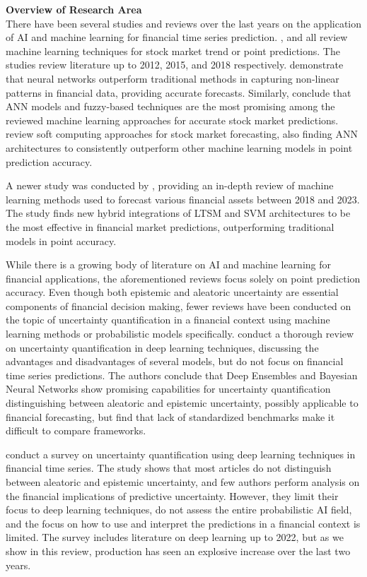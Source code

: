 \textbf{Overview of Research Area}\\
There have been several studies and reviews over the last years on the application of AI and machine learning for financial time series prediction. \textcite{preethi2012stock}, \textcite{soni2015cloud} and \textcite{gandhmalstockmarket2019} all review machine learning techniques for stock market trend or point predictions. The studies review literature up to 2012, 2015, and 2018 respectively. \textcite{soni2015cloud} demonstrate that neural networks outperform traditional methods in capturing non-linear patterns in financial data, providing accurate forecasts. Similarly, \textcite{gandhmalstockmarket2019} conclude that ANN models and fuzzy-based techniques are the most promising among the reviewed machine learning approaches for accurate stock market predictions. \textcite{shi2019soft} review soft computing approaches for stock market forecasting, also finding ANN architectures to consistently outperform other machine learning models in point prediction accuracy. 

A newer study was conducted by \textcite{Khattak2023SurveyAIModels}, providing an in-depth review of machine learning methods used to forecast various financial assets between 2018 and 2023. The study finds new hybrid integrations of LTSM and SVM architectures to be the most effective in financial market predictions, outperforming traditional models in point accuracy.

While there is a growing body of literature on AI and machine learning for financial applications, the aforementioned reviews focus solely on point prediction accuracy. Even though both epistemic and aleatoric uncertainty are essential components of financial decision making, fewer reviews have been conducted on the topic of uncertainty quantification in a financial context using machine learning methods or probabilistic models specifically. \textcite{abdar2021ReviewUQ} conduct a thorough review on uncertainty quantification in deep learning techniques, discussing the advantages and disadvantages of several models, but do not focus on financial time series predictions. The authors conclude that Deep Ensembles and Bayesian Neural Networks show promising capabilities for uncertainty quantification distinguishing between aleatoric and epistemic uncertainty, possibly applicable to financial forecasting, but find that lack of standardized benchmarks make it difficult to compare frameworks.

\textcite{Blasco_et_al_2024} conduct a survey on uncertainty quantification using deep learning techniques in financial time series. The study shows that most articles do not distinguish between aleatoric and epistemic uncertainty, and few authors perform analysis on the financial implications of predictive uncertainty. However, they limit their focus to deep learning techniques, do not assess the entire probabilistic AI field, and the focus on how to use and interpret the predictions in a financial context is limited. The survey includes literature on deep learning up to 2022, but as we show in this review, production has seen an explosive increase over the last two years. 

